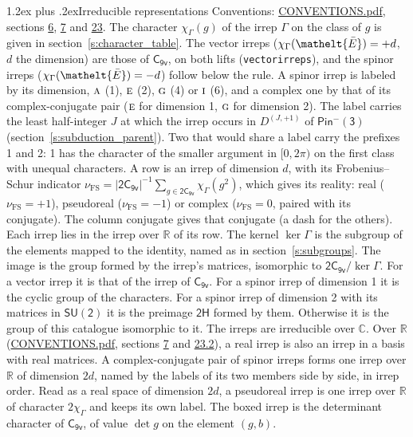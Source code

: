 \documentclass[10pt,a4paper]{article}
\makeatletter
\renewcommand\section{\@startsection{section}{1}{\z@}{-3ex plus -1ex minus -.2ex}%
  {1.2ex plus .2ex}{\normalfont\large\sffamily\bfseries\color{parttitle}}}
\numberwithin{equation}{section}
\newcommand{\eltfont}[1]{{\let\sigma\eltsigma\mathelt{#1}}}
\newcommand{\grp}[1]{\mathsf{#1}}
\newcommand{\irr}[1]{\text{\normalfont\scshape #1}}
\newcommand{\elt}[1]{\eltfont{#1}}
\newcommand{\irrJp}[2]{D^{(#1,#2)}}
\newcommand{\irchar}[1]{\chi_{#1}}
\newcommand{\fsind}{\nu_{\mathrm{FS}}}
\newcommand{\barred}[1]{\bar{#1}}
\makeatother
\begin{document}
\section{Irreducible representations}\label{s:irreps}
Conventions: \href{../../CONVENTIONS.pdf}{CONVENTIONS.pdf}, sections \href{../../../rotation/CONVENTIONS.pdf\#conv.6}{6}, \href{../../../rotation/CONVENTIONS.pdf\#conv.7}{7} and \href{../../CONVENTIONS.pdf\#conv.23}{23}.
\leavevmode\label{n:function.character}\label{n:irrep.Gamma}The character $\irchar{\Gamma}(g)$ of the irrep $\Gamma$ on the class of $g$ is given in section~\ref{s:character_table}. \label{n:index.dimension}The vector irreps ($\irchar{\Gamma}(\elt{\barred{E}}) = +d$, $d$ the dimension) are those of \href{../../../rotation/data/pdf/C9v.pdf}{$\grp{C_{9v}}$}, on both lifts (\texttt{vectorirreps}), and the spinor irreps ($\irchar{\Gamma}(\elt{\barred{E}}) = -d$) follow below the rule. A spinor irrep is labeled by its dimension, $\irr{a}$ (1), $\irr{e}$ (2), $\irr{g}$ (4) or $\irr{i}$ (6), and a complex one by that of its complex-conjugate pair ($\irr{e}$ for dimension 1, $\irr{g}$ for dimension 2). The label carries the least half-integer $J$ at which the irrep occurs in $\irrJp{J}{+1}$ of $\grp{Pin^{-}(3)}$ (section~\ref{s:subduction_parent}). Two that would share a label carry the prefixes 1 and 2: 1 has the character of the smaller argument in $[0, 2\pi)$ on the first class with unequal characters.
\leavevmode\label{n:index.frobenius}\label{n:head.irrep}\label{n:head.reality}A row is an irrep of dimension $d$, with its Frobenius--Schur indicator $\fsind = |\grp{2C_{9v}}|^{-1}\allowbreak\sum_{g\in\grp{2C_{9v}}}\irchar{\Gamma}(g^2)$, which gives its reality: real ($\fsind = +1$), pseudoreal ($\fsind = -1$) or complex ($\fsind = 0$, paired with its conjugate). \label{n:head.conjugate}The column conjugate gives that conjugate (a dash for the others). \label{n:head.over.real}Each irrep lies in the irrep over $\mathbb{R}$ of its row. \label{n:head.kernel}The kernel $\ker\Gamma$ is the subgroup of the elements mapped to the identity, named as in section~\ref{s:subgroups}. \label{n:head.image}The image is the group formed by the irrep's matrices, isomorphic to $\grp{2C_{9v}}/\ker\Gamma$. For a vector irrep it is that of the irrep of \href{../../../rotation/data/pdf/C9v.pdf}{$\grp{C_{9v}}$}. For a spinor irrep of dimension 1 it is the cyclic group of the characters. For a spinor irrep of dimension 2 with its matrices in $\grp{SU(2)}$ it is the preimage $\grp{2H}$ formed by them. Otherwise it is the group of this catalogue isomorphic to it. The irreps are irreducible over $\mathbb{C}$. Over $\mathbb{R}$ (\href{../../CONVENTIONS.pdf}{CONVENTIONS.pdf}, sections \href{../../../rotation/CONVENTIONS.pdf\#conv.7}{7} and \href{../../CONVENTIONS.pdf\#conv.23.2}{23.2}), a real irrep is also an irrep in a basis with real matrices. A complex-conjugate pair of spinor irreps forms one irrep over $\mathbb{R}$ of dimension $2d$, named by the labels of its two members side by side, in irrep order. Read as a real space of dimension $2d$, a pseudoreal irrep is one irrep over $\mathbb{R}$ of character $2\irchar{\Gamma}$ and keeps its own label. \label{n:mark.determinant}The boxed irrep is the determinant character of \href{../../../rotation/data/pdf/C9v.pdf}{$\grp{C_{9v}}$}, of value $\det g$ on the element $(g, b)$.
\end{document}
